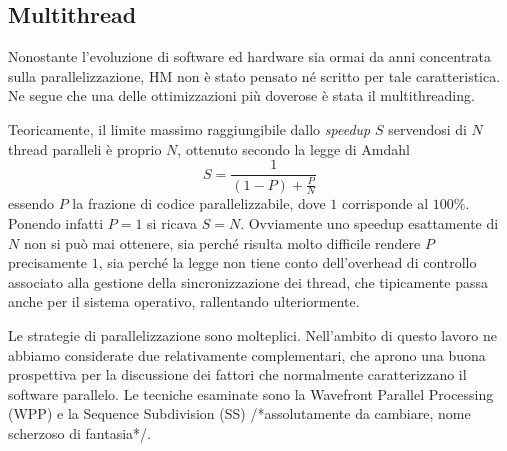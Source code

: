 \subsection{Multithread}
Nonostante l'evoluzione di software ed hardware sia ormai da anni concentrata 
sulla parallelizzazione, HM non è stato pensato né scritto per tale 
caratteristica. Ne segue che una delle ottimizzazioni più doverose è stata il 
multithreading.
\par Teoricamente, il limite massimo raggiungibile dallo \emph{speedup} $S$ 
servendosi 
di $N$ thread paralleli è proprio $N$, ottenuto secondo la legge di Amdahl
$$S = \frac{1}{(1-P)+\frac{P}{N}}$$
essendo $P$ la frazione di codice parallelizzabile, dove $1$ corrisponde al 
$100\%$. Ponendo infatti $P = 1$ si ricava $S = N$. Ovviamente uno speedup 
esattamente di $N$ non si può mai ottenere, sia perché risulta molto difficile 
rendere 
$P$ precisamente $1$, sia perché la legge non tiene conto dell'overhead di 
controllo associato alla gestione della sincronizzazione dei thread, che 
tipicamente passa anche per il sistema operativo, rallentando ulteriormente.
\par Le strategie di parallelizzazione sono molteplici. Nell'ambito di questo 
lavoro ne abbiamo considerate due relativamente complementari, che aprono
una buona prospettiva per la discussione dei fattori che normalmente 
caratterizzano il software parallelo. Le tecniche esaminate sono la Wavefront 
Parallel Processing (WPP) e la Sequence Subdivision (SS) /*assolutamente da 
cambiare, nome scherzoso di fantasia*/.

